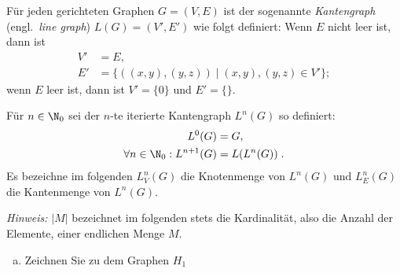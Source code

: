 \documentclass[12pt]{article}
\begin{document}
\begin{aufgabe}[7]
  Für jeden gerichteten Graphen $G=(V,E)$ ist der sogenannte
  \emph{Kantengraph} (engl.~\emph{line graph}) $L(G)=(V',E')$ wie
  folgt definiert: Wenn $E$ nicht leer ist, dann ist
  \begin{align*}
    V' &= E, \\
    E' &= \{ ( (x,y), (y,z) ) \mid (x,y), (y,z)\in V'  \};
  \end{align*}
  wenn $E$ leer ist, dann ist $V'=\{0\}$ und $E'=\{\}$.

  Für $n\in\N_0$ sei der $n$-te iterierte Kantengraph $L^n(G)$ so definiert:
  \begin{align*}
    L^0(G) &= G, \\
    \forall n\in\N_0:L^{n+1}(G) &= L(L^n(G)) \;.
  \end{align*}
  Es bezeichne im folgenden $L^n_V(G)$ die Knotenmenge von $L^n(G)$ und
  $L^n_E(G)$ die Kantenmenge von $L^n(G)$.

  \emph{Hinweis:} $|M|$ bezeichnet im folgenden stets die
  Kardinalität, also die Anzahl der Elemente, einer endlichen Menge
  $M$.

  \begin{enumerate}[a)]
  \item Zeichnen Sie zu dem Graphen $H_1$

  \qquad  {}


\end{enumerate}
\end{aufgabe}
\end{document}
